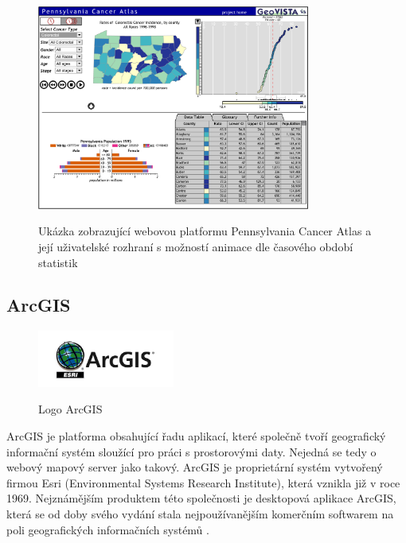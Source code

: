 \begin{figure}[h!]  \centering
\includegraphics[width=0.8\textwidth]{../img/pennsylvania-cancer-atlas.png}
	\caption{Ukázka zobrazující webovou platformu Pennsylvania
Cancer Atlas a její uživatelské rozhraní s možností animace dle
časového období statistik}
	\cite{cancer-atlas}
	\label{fig:cancer-atlas}
\end{figure}
 
\newpage
\subsection{ArcGIS}

\begin{figure}[h!]  \centering
\includegraphics[width=0.4\textwidth]{../img/arcgis-logo.jpg}
	\caption{Logo ArcGIS}
	\cite{arcgis-logo}
	\label{fig:arcgis-logo}
\end{figure} \bigskip

ArcGIS je platforma obsahující řadu aplikací, které společně tvoří
geografický informační systém sloužící pro práci s prostorovými
daty. Nejedná se tedy o webový mapový server jako takový. ArcGIS je
proprietární systém vytvořený firmou Esri (Environmental Systems Research
Institute), která vznikla již v roce 1969. Nejznámějším produktem této společnosti je desktopová aplikace ArcGIS, která
se od doby svého vydání stala nejpoužívanějším komerčním softwarem na poli geografických informačních systémů \cite{arcgis-wiki}.

